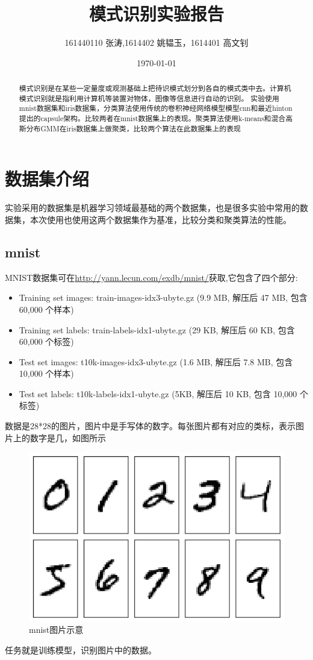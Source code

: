 \documentclass{article}
\title{\textbf{\zihao{2}模式识别实验报告\\ }}
\author{161440110 张涛,1614402 姚韫玉，1614401 高文钊}
\date{\today}
\begin{document}

\maketitle
\begin{abstract}
模式识别是在某些一定量度或观测基础上把待识模式划分到各自的模式类中去。计算机模式识别就是指利用计算机等装置对物体，图像等信息进行自动的识别。
实验使用mnist数据集\cite{mnist}和iris\cite{iris}数据集，分类算法使用传统的卷积神经网络模型模型cnn\cite{lecun1998gradient}和最近hinton提出的capsule架构\cite{sabour2017dynamic}。比较两者在mnist数据集上的表现。聚类算法使用k-means\cite{hartigan1979algorithm}和混合高斯分布GMM\cite{reynolds2015gaussian}在iris数据集上做聚类，比较两个算法在此数据集上的表现
\end{abstract}
\section{数据集介绍}
实验采用的数据集是机器学习领域最基础的两个数据集，也是很多实验中常用的数据集，本次使用也使用这两个数据集作为基准，比较分类和聚类算法的性能。
\subsection{mnist\cite{mnist}}
MNIST数据集可在\url{http://yann.lecun.com/exdb/mnist/}获取,它包含了四个部分:
\begin{itemize}
	\item Training set images: train-images-idx3-ubyte.gz (9.9 MB, 解压后 47 MB, 包含 60,000 个样本)
    \item Training set labels: train-labels-idx1-ubyte.gz (29 KB, 解压后 60 KB, 包含 60,000 个标签)
    \item Test set images: t10k-images-idx3-ubyte.gz (1.6 MB, 解压后 7.8 MB, 包含 10,000 个样本)
    \item Test set labels: t10k-labels-idx1-ubyte.gz (5KB, 解压后 10 KB, 包含 10,000 个标签)
\end{itemize}

数据是28*28的图片，图片中是手写体的数字。每张图片都有对应的类标，表示图片上的数字是几，如图所示
\begin{figure}[htbp]
\centering\includegraphics[scale=0.6]{mnist}
\caption{mnist图片示意}\label{fig:1}
\end{figure}
任务就是训练模型，识别图片中的数据。
\end{document}

